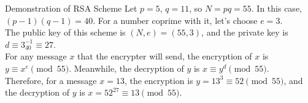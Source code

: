 \begin{ln-quest}{Demonstration of RSA Scheme}{}
    Let $p = 5$, $q = 11$, so $N = pq = 55$. In this case, $(p - 1)(q - 1) = 40$. For a number coprime with it, let's choose $e = 3$. \\
    The public key of this scheme is $(N, e) = (55, 3)$, and the private key is $d \equiv 3_{40}^{-1} \equiv 27$. \\
    For any message $x$ that the encrypter will send, the encryption of $x$ is $y \equiv x^e\pmod{55}$. Meanwhile, the decryption of $y$ is $x \equiv y^d\pmod{55}$. \\
    Therefore, for a message $x = 13$, the encryption is $y = {13}^3 \equiv 52\pmod{55}$, and the decryption of $y$ is $x = {52}^{27} \equiv 13\pmod{55}$.
\end{ln-quest}

